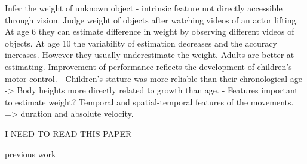  \cite{sciutti_development_2019}
Infer the weight of unknown object - intrinsic feature not directly accessible through vision. Judge weight of objects after watching videos of an actor lifting. At age 6 they can estimate difference in weight by observing different videos of objects. At age 10 the variability of estimation decreases and the accuracy increases. However they usually underestimate the weight. Adults are better at estimating. Improvement of performance reflects the development of children's motor control. - Children's stature was more reliable than their chronological age -> Body heights more directly related to growth than age. - Features important to estimate weight? Temporal and spatial-temporal features of the movements. => duration and absolute velocity. 

 \cite{lastrico_careful_2021}
I NEED TO READ THIS PAPER

previous work 
